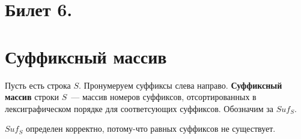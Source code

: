 \section{Билет 6.}
\section*{Суффиксный массив}
\par
Пусть есть строка $S$. Пронумеруем суффиксы слева направо.
\textbf{Суффиксный массив} строки $S$~--- массив номеров суффиксов, отсортированных
в лексиграфическом порядке для соответсующих суффиксов. 
Обозначим за $Suf_S$.
\par
$Suf_S$ определен корректно, потому-что равных суффиксов не существует.
